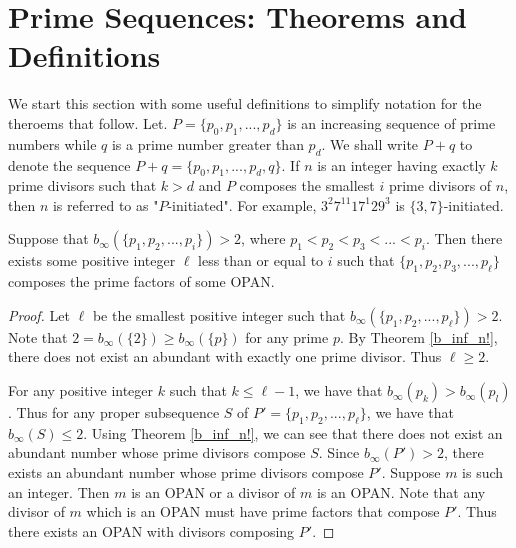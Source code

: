 \documentclass[../paper.tex]{subfiles}
\begin{document}
\section{Prime Sequences: Theorems and Definitions}

We start this section with some useful definitions to simplify
notation for the theroems that follow. Let. $P = \{p_0, p_1, ...,
p_d\}$ is an increasing sequence of prime numbers while $q$ 
is a prime number greater than $p_d$. We shall write $P + q$
to denote the sequence $P + q = \{p_0, p_1, ..., p_d, q\}$. If $n$ 
is an integer having exactly $k$ prime divisors such that $k > d$ 
and $P$ composes the smallest $i$ prime divisors of $n$, then 
$n$ is referred to as "$P$-initiated". For example, $3^2 7^{11} 
17^1 29^3$ is $\{3, 7\}$-initiated.

\begin{theorem} \label{Primechops}
Suppose that $b_{\infty}(\{p_1,p_2, ..., p_i\}) > 2$,
where $p_1 < p_2 < p_3 < ... < p_i$. Then there exists some
positive integer $\ell$ less than or equal to $i$ such that 
$\{p_1, p_2, p_3, ..., p_\ell\}$ composes the prime factors of
some OPAN.
\end{theorem}

\begin{proof}
Let $\ell$ be the smallest positive integer such that 
$b_{\infty}(\{p_1, p_2, ..., p_\ell\}) > 2$. Note that
$2 = b_{\infty}(\{2\}) \geq b_{\infty}(\{p\})$ for any prime $p$.
By Theorem {\ref{b_inf_n!}}, there does not
exist an abundant with exactly one prime divisor. Thus $\ell 
\geq 2$.

For any positive integer $k$ such that $k \leq \ell - 1$, we have
that $b_{\infty}(p_k) > b_{\infty}(p_l)$. Thus for any proper 
subsequence $S$ of $P' = \{p_1, p_2, ..., p_{\ell}\}$, we have that 
$b_{\infty}(S) \leq 2$. Using Theorem {\ref{b_inf_n!}}, we can see
that there does not exist an abundant number whose prime divisors
compose $S$. Since $b_{\infty}(P') > 2$, there exists an abundant 
number whose prime
divisors compose $P'$. Suppose $m$ is such an integer. Then $m$ is
an OPAN or a divisor of $m$ is an OPAN. Note that any divisor of $m$
which is an OPAN must have prime factors that compose $P'$. Thus
there exists an OPAN with divisors composing $P'$.
\end{proof}

\end{document}
